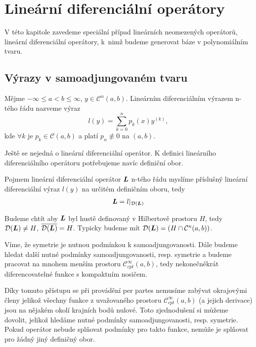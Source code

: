 \section{Lineární diferenciální operátory}

V této kapitole zavedeme speciální případ lineárních neomezených operátorů, lineární diferenciální operátory, k~nimž budeme generovat báze v polynomiálním tvaru.

\subsection{Výrazy v samoadjungovaném tvaru}

\begin{definition}
Mějme $-\infty \leq a < b \leq \infty$, $y \in \mathcal{C}^n (a, b)$.
Lineárním diferenciálním výrazem n-tého řádu nazveme výraz
\begin{equation}
    l(y) = \sum_{k=0}^{n} p_k (x) y^{(k)},
\end{equation}
kde $\forall k$ je $p_k \in \mathcal{C}(a, b)$ a platí $p_n \not\equiv 0$ na $(a, b)$.
\end{definition}

\begin{remark}
    Ještě se nejedná o lineární diferenciální operátor. K definici lineárního diferenciálního operátoru potřebujeme navíc definiční obor.
\end{remark}

\begin{definition}
Pojmem lineární diferenciální operátor $\boldsymbol{L}$ n-tého řádu myslíme příslušný lineární
diferenciální výraz $l(y)$ na určitém definičním oboru, tedy
\begin{align*}
    \boldsymbol{L} = l \rvert_{\mathcal{D}(\boldsymbol{L})}
\end{align*}
\end{definition}

Budeme chtít aby $\boldsymbol{L}$ byl hustě definovaný v Hilbertově prostoru $H$, tedy $\mathcal{D}(\boldsymbol{L}) \neq H$, $\overline{\mathcal{D}(\boldsymbol{L})} = H$.
Typicky budeme mít $\mathcal{D}(\boldsymbol{L}) = \left(H \cap \mathcal{C}^n (a,b)\right)$.

Víme, že symetrie je nutnou podmínkou k samoadjungovanosti. Dále budeme hledat další
nutné podmínky samoadjungovanosti, resp. symetrie a budeme pracovat na mnohem menším prostoru $\mathcal{C}^{\infty}_{cpt} (a,b)$, tedy nekonečněkrát diferencovatelné funkce
s kompaktním nosičem.
\begin{remark}
    Díky tomuto přístupu se při provádění per partes nemusíme zabývat okrajovými členy
    jelikož všechny funkce z uvažovaného prostoru $\mathcal{C}^{\infty}_{cpt} (a,b)$ (a jejich derivace) jsou na nějakém okolí krajních bodů nulové. Toto zjednodušení si můžeme dovolit, jelikož hledáme nutné podmínky samoadjungovanosti, resp. symetrie. Pokud operátor nebude splňovat podmínky pro takto  funkce, nemůže je splňovat pro žádný jiný definičný obor.
\end{remark}


